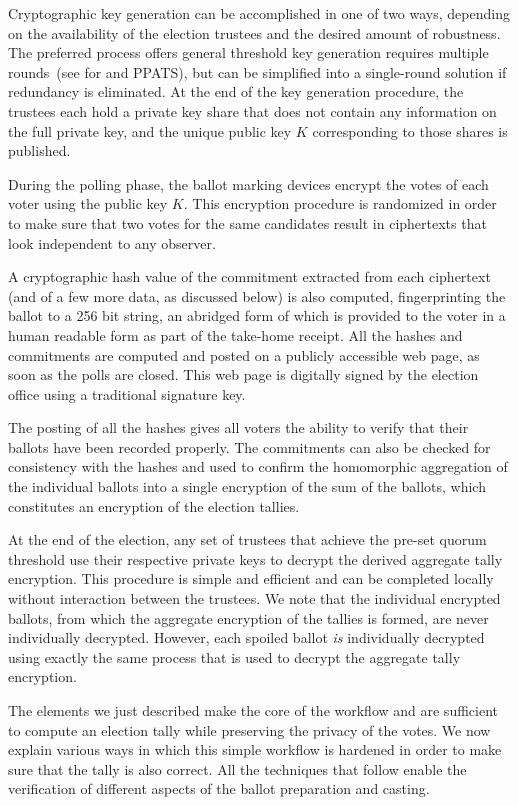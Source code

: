 Cryptographic key generation can be accomplished in one of two ways,
depending on the availability of the election trustees and the desired
amount of robustness. The preferred process offers general threshold
key generation requires multiple rounds~(see \cite{GJKR07} for
\elgamal and PPATS), but can be simplified into a single-round
solution if redundancy is eliminated.  At the end of the key
generation procedure, the trustees each hold a private key share that
does not contain any information on the full private key, and the
unique public key $K$ corresponding to those shares is published.

During the polling phase, the ballot marking devices encrypt the votes
of each voter using the public key $K$. This encryption procedure is
randomized in order to make sure that two votes for the same
candidates result in ciphertexts that look independent to any
observer. 

A cryptographic hash value of the commitment extracted from each
ciphertext (and of a few more data, as discussed below) is also
computed, fingerprinting the ballot to a 256 bit string, an abridged form of which is
provided to the voter in a human readable form as part of the
take-home receipt. All the hashes and commitments are computed and
posted on a publicly accessible web page, as soon as the polls are
closed. This web page is digitally signed by the election office using
a traditional signature key.

The posting of all the hashes gives all voters the ability to verify
that their ballots have been recorded properly.  The commitments
can also be checked for consistency with the hashes and used to
confirm the homomorphic aggregation of the individual ballots into a
single encryption of the sum of the ballots, which constitutes an
encryption of the election tallies.

At the end of the election, any set of trustees that achieve the
pre-set quorum threshold use their respective private keys to decrypt
the derived aggregate tally encryption.  This procedure is simple and
efficient and can be completed locally without interaction between the
trustees.  We note that the individual encrypted ballots, from which
the aggregate encryption of the tallies is formed, are never
individually decrypted.  However, each spoiled ballot {\em is}
individually decrypted using exactly the same process that is used to
decrypt the aggregate tally encryption.

The elements we just described make the core of the workflow and are
sufficient to compute an election tally while preserving the privacy
of the votes. We now explain various ways in which this simple
workflow is hardened in order to make sure that the tally is also
correct. All the techniques that follow enable the verification of
different aspects of the ballot preparation and casting.


